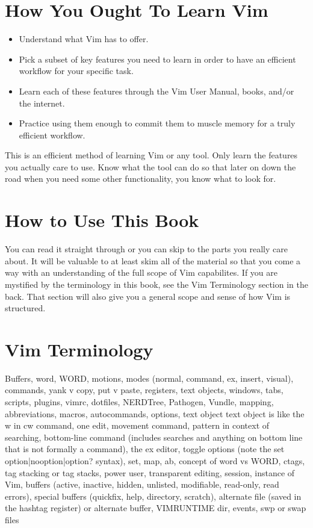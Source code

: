 \documentclass[12pt]{book}
\begin{document}
\section{How You Ought To Learn Vim}
\begin{itemize}
\item Understand what Vim has to offer.
\item Pick a subset of key features you need to learn in order to have an efficient workflow for your specific task.
\item Learn each of these features through the Vim User Manual, books, and/or the internet.
\item Practice using them enough to commit them to muscle memory for a truly efficient workflow.
\end{itemize}
This is an efficient method of learning Vim or any tool.
Only learn the features you actually care to use.
Know what the tool can do so that later on down the road when you need some other functionality, you know what to look for.

\section{How to Use This Book}
You can read it straight through or you can skip to the parts you really care about.
It will be valuable to at least skim all of the material so that you come a way with an understanding of the full scope of Vim capabilites.
If you are mystified by the terminology in this book, see the Vim Terminology section in the back.
That section will also give you a general scope and sense of how Vim is structured.

\section{Vim Terminology}
Buffers, word, WORD, motions, modes (normal, command, ex, insert, visual), commands, yank v copy, put v paste, registers, text objects, windows, tabs, scripts, plugins, vimrc, dotfiles,
NERDTree, Pathogen, Vundle, mapping, abbreviations, macros, autocommands, options, text object text object is like the w in cw command, one edit, movement command, pattern in context of
searching, bottom-line command (includes searches and anything on bottom line that is not formally a command), the ex editor, toggle options (note the set option|nooption|option? syntax),
set, map, ab, concept of word vs WORD, ctags, tag stacking or tag stacks, power user, transparent editing, session, instance of Vim, buffers (active, inactive, hidden, unlisted, modifiable, read-only,
read errors), special buffers (quickfix, help, directory, scratch), alternate file (saved in the hashtag register) or alternate buffer, VIMRUNTIME dir, events, swp or swap files
\end{document}
